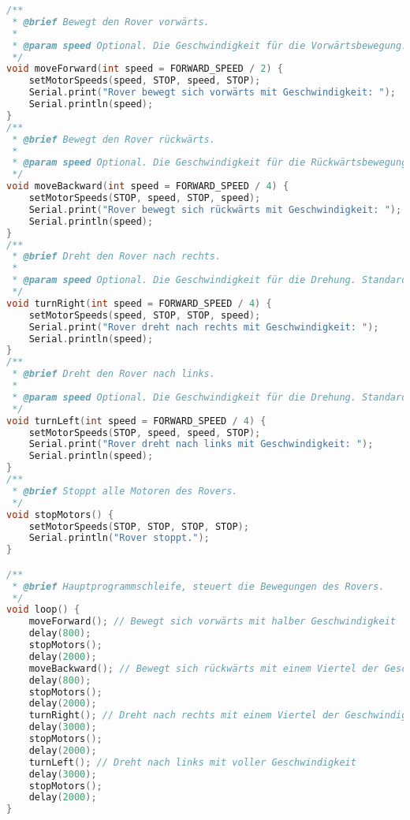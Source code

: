 \documentclass{vorlage-design-main}
\begin{document}
\begin{lstlisting}[language={C++}]
/**
 * @brief Bewegt den Rover vorwärts.
 * 
 * @param speed Optional. Die Geschwindigkeit für die Vorwärtsbewegung. Standard ist die Hälfte der maximalen Geschwindigkeit.
 */
void moveForward(int speed = FORWARD_SPEED / 2) {
    setMotorSpeeds(speed, STOP, speed, STOP);
    Serial.print("Rover bewegt sich vorwärts mit Geschwindigkeit: ");
    Serial.println(speed);
}
/**
 * @brief Bewegt den Rover rückwärts.
 * 
 * @param speed Optional. Die Geschwindigkeit für die Rückwärtsbewegung. Standard ist ein Viertel der maximalen Geschwindigkeit.
 */
void moveBackward(int speed = FORWARD_SPEED / 4) {
    setMotorSpeeds(STOP, speed, STOP, speed);
    Serial.print("Rover bewegt sich rückwärts mit Geschwindigkeit: ");
    Serial.println(speed);
}
/**
 * @brief Dreht den Rover nach rechts.
 * 
 * @param speed Optional. Die Geschwindigkeit für die Drehung. Standard ist ein Viertel der maximalen Geschwindigkeit.
 */
void turnRight(int speed = FORWARD_SPEED / 4) {
    setMotorSpeeds(speed, STOP, STOP, speed);
    Serial.print("Rover dreht nach rechts mit Geschwindigkeit: ");
    Serial.println(speed);
}
/**
 * @brief Dreht den Rover nach links.
 * 
 * @param speed Optional. Die Geschwindigkeit für die Drehung. Standard ist die maximale Geschwindigkeit.
 */
void turnLeft(int speed = FORWARD_SPEED / 4) {
    setMotorSpeeds(STOP, speed, speed, STOP);
    Serial.print("Rover dreht nach links mit Geschwindigkeit: ");
    Serial.println(speed);
}
/**
 * @brief Stoppt alle Motoren des Rovers.
 */
void stopMotors() {
    setMotorSpeeds(STOP, STOP, STOP, STOP);
    Serial.println("Rover stoppt.");
}

/**
 * @brief Hauptprogrammschleife, steuert die Bewegungen des Rovers.
 */
void loop() {
    moveForward(); // Bewegt sich vorwärts mit halber Geschwindigkeit
    delay(800);
    stopMotors();
    delay(2000);
    moveBackward(); // Bewegt sich rückwärts mit einem Viertel der Geschwindigkeit
    delay(800);
    stopMotors();
    delay(2000);
    turnRight(); // Dreht nach rechts mit einem Viertel der Geschwindigkeit
    delay(3000);
    stopMotors();
    delay(2000);
    turnLeft(); // Dreht nach links mit voller Geschwindigkeit
    delay(3000);
    stopMotors();
    delay(2000);
}
\end{lstlisting}


\clearpage
\printbibliography
\end{document}
